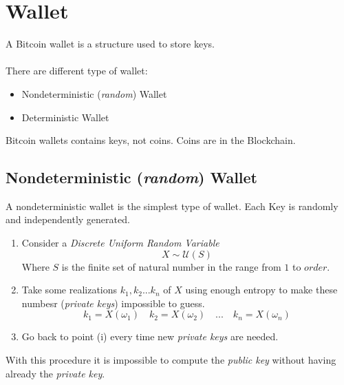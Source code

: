 
\chapter{Wallet} %

\label{bip32} %





A Bitcoin wallet is a structure used to store keys. \\ \\
There are different type of wallet:
\begin{itemize}
	\item Nondeterministic (\textit{random}) Wallet
	\item Deterministic Wallet
\end{itemize}

\begin{remark}
	Bitcoin wallets contains keys, not coins. Coins are in the Blockchain.
\end{remark}

\section{Nondeterministic (\textit{random}) Wallet}
A nondeterministic wallet is the simplest type of wallet. Each Key is randomly and independently generated.

\begin{enumerate}[label=(\roman*)]
	\item Consider a \textit{Discrete Uniform Random Variable}
	\begin{equation*}
		X\sim \mathcal{U}(S)
	\end{equation*}
	Where $S$ is the finite set of natural number in the range from $1$ to $order$.
	\item Take some realizations $k_1,k_2...k_n$ of $X$ using enough entropy to make these numbesr (\textit{private keys}) impossible to guess.
	\begin{equation*}
		k_1=X(\omega_1) \quad  k_2=X(\omega_2) \quad ... \quad k_n=X(\omega_n)
	\end{equation*}
	\item Go back to point (i) every time new \textit{private keys} are needed.
\end{enumerate}
With this procedure it is impossible to compute the \textit{public key} without having already the \textit{private key}.

